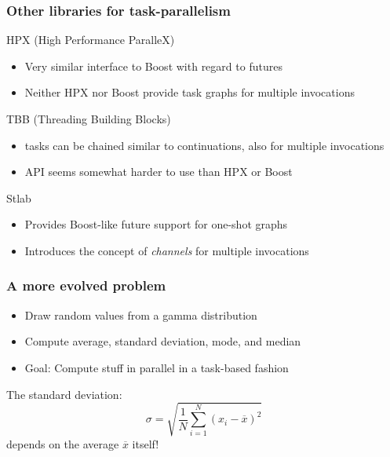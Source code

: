 \documentclass[12pt,aspectratio=169]{beamer}
\begin{document}
\begin{frame}[frame]
\frametitle{Other libraries for task-parallelism}

HPX (High Performance ParalleX)
\begin{itemize}
\item Very similar interface to Boost with regard to futures
\item Neither HPX nor Boost provide task graphs for multiple invocations
\end{itemize}
\bigskip

TBB (Threading Building Blocks)
\begin{itemize}
\item tasks can be chained similar to continuations, also for multiple invocations
\item API seems somewhat harder to use than HPX or Boost
\end{itemize}
\bigskip

Stlab
\begin{itemize}
\item Provides Boost-like future support for one-shot graphs
\item Introduces the concept of \textit{channels} for multiple invocations
\end{itemize}

\end{frame}


\begin{frame}[fragile]
\frametitle{A more evolved problem}

\begin{itemize}
\item Draw random values from a gamma distribution
\item Compute average, standard deviation, mode, and median
\item Goal: Compute stuff in parallel in a task-based fashion
\end{itemize}
\bigskip

The standard deviation:
\begin{equation*}
\sigma = \sqrt{\frac{1}{N} \sum_{i=1}^N (x_i - \overline{x})^2}
\end{equation*}
depends on the average $\overline{x}$ itself!

\end{frame}
\end{document}
